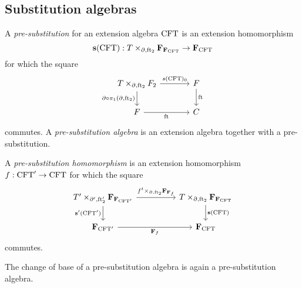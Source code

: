 \subsection{Substitution algebras}

\begin{defn}
A \emph{pre-substitution} for an extension algebra $\mathrm{CFT}$ is an
extension homomorphism
\begin{equation*}
\mathbf{s}(\stesys):\cobesys{\stesyst}{\famesys{\famesys{\stesys}}}{\ebd}{\eft[2]}\to \famesys{\stesys}
\end{equation*}
for which the square
\begin{equation*}
\begin{tikzcd}[column sep=large]
\pullback{\stesyst}{\stesysf_2}{\ebd}{\eft[2]}
  \ar{r}{s(\stesys)_0}
  \ar{d}[swap]{\ebd\circ\pullbackpr{1}{\ebd}{\eft[2]}}
  &
\stesysf 
  \ar{d}{\eft}
  \\
\stesysf 
  \ar{r}[swap]{\eft}
  &
\stesysc
\end{tikzcd}
\end{equation*}
commutes. A \emph{pre-substitution algebra} is an extension algebra
together with a pre-substitution.
\end{defn}

\begin{defn}
A \emph{pre-substitution homomorphism} is an extension homomorphism $f:\mathrm{CFT}'\to \mathrm{CFT}$
for which the square
\begin{equation*}
\begin{tikzcd}[column sep=huge]
\cobesys{\stesyst'}{\famesys{\famesys{\stesys'}}}{\ebd'}{\eft[2]'}
  \ar{r}{\pullback{f^t}{\famehom{\famehom{f}}}{\ebd}{\eft[2]}}
  \ar{d}[swap]{\mathbf{s}'(\stesys')}
  &
\cobesys{\stesyst}{\famesys{\famesys{\stesys}}}{\ebd}{\eft[2]}
  \ar{d}{\mathbf{s}(\stesys)}
  \\
\famesys{\stesys'}
  \ar{r}[swap]{\famehom{f}}
  &
\famesys{\stesys}
\end{tikzcd}
\end{equation*}
commutes.
\end{defn}

\begin{lem}
The change of base of a pre-substitution algebra is again a pre-substitution algebra.
\end{lem}


